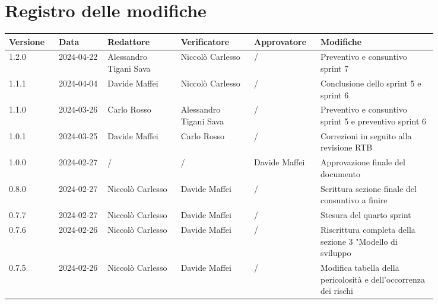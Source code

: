 \section*{Registro delle modifiche}
 {
  \renewcommand{\arraystretch}{1.5}
  \scriptsize
  \begin{longtable}{p{0.10\linewidth}p{0.10\linewidth}p{0.15\linewidth}p{0.15\linewidth}p{0.10\linewidth}p{0.24\linewidth}}
	  \textbf{Versione} & \textbf{Data} & \textbf{Redattore} & \textbf{Verificatore}  & \textbf{Approvatore} & \textbf{Modifiche}                                                \\
	  \toprule
	  1.2.0             & 2024-04-22    & Alessandro Tigani Sava	& Niccolò Carlesso      & /                    & Preventivo e consuntivo sprint 7	\\
	  \hline
	  1.1.1             & 2024-04-04    & Davide Maffei      & Niccolò Carlesso      & /                    & Conclusione dello sprint 5 e sprint 6            \\
	  \hline
	  1.1.0             & 2024-03-26    & Carlo Rosso        & Alessandro Tigani Sava                      & /                    & Preventivo e consuntivo sprint 5 e preventivo sprint 6            \\
	  \hline
	  1.0.1             & 2024-03-25    & Davide Maffei      & Carlo Rosso            & /                    & Correzioni in seguito alla revisione RTB                          \\
	  \hline
	  1.0.0             & 2024-02-27    & /                  & /                      & Davide Maffei        & Approvazione finale del documento                                 \\
	  \hline
	  0.8.0             & 2024-02-27    & Niccolò Carlesso   & Davide Maffei          & /                    & Scrittura sezione finale del consuntivo a finire                  \\
	  \hline
	  0.7.7             & 2024-02-27    & Niccolò Carlesso   & Davide Maffei          & /                    & Stesura del quarto sprint                                         \\
	  \hline
	  0.7.6             & 2024-02-26    & Niccolò Carlesso   & Davide Maffei          & /                    & Riscrittura completa della sezione 3 "Modello di sviluppo         \\
	  \hline
	  0.7.5             & 2024-02-26    & Niccolò Carlesso   & Davide Maffei          & /                    & Modifica tabella della pericolosità e dell’occorrenza dei rischi  \\

\end{longtable}}
